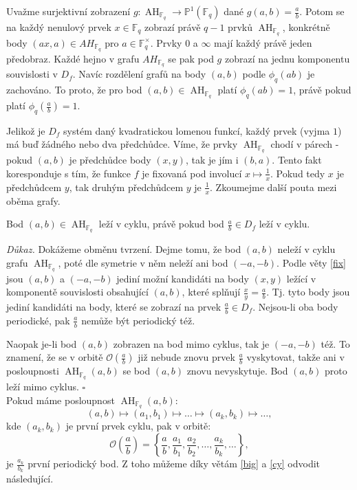 \documentclass[12pt]{report}
\DeclareMathOperator{\AH}{AH}
\begin{document}
Uvažme surjektivní zobrazení $g : \AH_{\mathbb{F}_q} \longrightarrow \mathbb{P}^1 (\mathbb{F}_q)$ dané $g(a,b) = \frac{a}{b}$. Potom se na každý nenulový prvek $x \in \mathbb{F}_q$ zobrazí právě $q-1$ prvků $\AH_{\mathbb{F}_q}$, konkrétně body $(ax,a) \in AH_{\mathbb{F}_q}$ pro $a \in \mathbb{F}_q ^{\times}$. Prvky $0$ a $\infty$ mají každý právě jeden předobraz. Každé hejno v grafu $AH_{\mathbb{F}_q}$ se pak pod $g$ zobrazí na jednu komponentu souvislosti v $D_f$. Navíc rozdělení grafů na body $(a,b)$ podle $\phi_q(ab)$ je zachováno. To proto, že pro bod $(a,b) \in \AH_{\mathbb{F}_q}$ platí $\phi_q(ab) =1$, právě pokud platí $\phi_q \left(\frac{a}{b} \right) = 1$.

Jelikož je $D_f$ systém daný kvadratickou lomenou funkcí, každý prvek (vyjma $1$) má buď žádného nebo dva předchůdce. Víme, že prvky $\AH_{\mathbb{F}_q}$ chodí v párech - pokud $(a,b)$ je předchůdce body $(x,y)$, tak je jím i $(b,a)$. Tento fakt koresponduje s tím, že funkce $f$ je fixovaná pod involucí $x \longmapsto \frac{1}{x}$. Pokud tedy $x$ je předchůdcem $y$, tak druhým předchůdcem $y$ je $\frac{1}{x}$. Zkoumejme další pouta mezi oběma grafy.

\begin{veta}\label{cy}
Bod $(a,b) \in \AH_{\mathbb{F}_q}$ leží v cyklu, právě pokud bod $\frac{a}{b} \in D_f$ leží v cyklu.
\end{veta}
\noindent \textit{Důkaz.} Dokážeme obměnu tvrzení. Dejme tomu, že bod $(a,b)$ neleží v cyklu grafu $\AH_{\mathbb{F}_q}$, poté dle symetrie v něm neleží ani bod $(-a,-b)$. Podle věty \ref{fix} jsou $(a,b)$ a $(-a,-b)$ jediní možní kandidáti na body $(x,y)$ ležící v komponentě souvislosti obsahující $(a,b)$, které splňují $\frac{x}{y} = \frac{a}{b}$. Tj. tyto body jsou jediní kandidáti na body, které se zobrazí na prvek $\frac{a}{b} \in D_f$. Nejsou-li oba body periodické, pak $\frac{a}{b}$ nemůže být periodický též.

Naopak je-li bod $(a,b)$ zobrazen na bod mimo cyklus, tak je $(-a,-b)$ též. To znamení, že se v orbitě $\mathcal{O}\left(\frac{a}{b}\right)$ již nebude znovu prvek $\frac{a}{b}$ vyskytovat, takže ani v posloupnosti $\AH_{\mathbb{F}_q} (a,b)$ se bod $(a,b)$ znovu nevyskytuje. Bod $(a,b)$ proto leží mimo cyklus. \hfill $\square$\\

Pokud máme posloupnost $\AH_{\mathbb{F}_q}(a,b)$:
$$(a,b) \longmapsto (a_1,b_1) \longmapsto \dots \longmapsto (a_k,b_k) \longmapsto \dots,$$
kde $(a_k,b_k)$ je první prvek cyklu, pak v orbitě: $$\mathcal{O}\left(\frac{a}{b}\right) =\left\lbrace \frac{a}{b},\frac{a_1}{b_1},\frac{a_2}{b_2},\dots,\frac{a_k}{b_k},\dots \right\rbrace,$$
je $\frac{a_k}{b_k}$ první periodický bod. Z toho můžeme díky větám \ref{big} a \ref{cy} odvodit následující.
\end{document}
